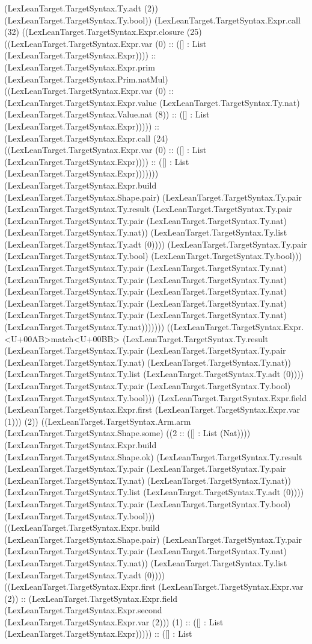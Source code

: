 \documentclass[11pt]{article}
\begin{document}
(LexLeanTarget.TargetSyntax.Ty.adt (2)) (LexLeanTarget.TargetSyntax.Ty.bool)) (LexLeanTarget.TargetSyntax.Expr.call (32) ((LexLeanTarget.TargetSyntax.Expr.closure (25) ((LexLeanTarget.TargetSyntax.Expr.var (0) :: ([] : List (LexLeanTarget.TargetSyntax.Expr)))) :: (LexLeanTarget.TargetSyntax.Expr.prim (LexLeanTarget.TargetSyntax.Prim.natMul) ((LexLeanTarget.TargetSyntax.Expr.var (0) :: (LexLeanTarget.TargetSyntax.Expr.value (LexLeanTarget.TargetSyntax.Ty.nat) (LexLeanTarget.TargetSyntax.Value.nat (8)) :: ([] : List (LexLeanTarget.TargetSyntax.Expr))))) :: (LexLeanTarget.TargetSyntax.Expr.call (24) ((LexLeanTarget.TargetSyntax.Expr.var (0) :: ([] : List (LexLeanTarget.TargetSyntax.Expr)))) :: ([] : List (LexLeanTarget.TargetSyntax.Expr))))))) (LexLeanTarget.TargetSyntax.Expr.build (LexLeanTarget.TargetSyntax.Shape.pair) (LexLeanTarget.TargetSyntax.Ty.pair (LexLeanTarget.TargetSyntax.Ty.result (LexLeanTarget.TargetSyntax.Ty.pair (LexLeanTarget.TargetSyntax.Ty.pair (LexLeanTarget.TargetSyntax.Ty.nat) (LexLeanTarget.TargetSyntax.Ty.nat)) (LexLeanTarget.TargetSyntax.Ty.list (LexLeanTarget.TargetSyntax.Ty.adt (0)))) (LexLeanTarget.TargetSyntax.Ty.pair (LexLeanTarget.TargetSyntax.Ty.bool) (LexLeanTarget.TargetSyntax.Ty.bool))) (LexLeanTarget.TargetSyntax.Ty.pair (LexLeanTarget.TargetSyntax.Ty.nat) (LexLeanTarget.TargetSyntax.Ty.pair (LexLeanTarget.TargetSyntax.Ty.nat) (LexLeanTarget.TargetSyntax.Ty.pair (LexLeanTarget.TargetSyntax.Ty.nat) (LexLeanTarget.TargetSyntax.Ty.pair (LexLeanTarget.TargetSyntax.Ty.nat) (LexLeanTarget.TargetSyntax.Ty.pair (LexLeanTarget.TargetSyntax.Ty.nat) (LexLeanTarget.TargetSyntax.Ty.nat))))))) ((LexLeanTarget.TargetSyntax.Expr.<U+00AB>match<U+00BB> (LexLeanTarget.TargetSyntax.Ty.result (LexLeanTarget.TargetSyntax.Ty.pair (LexLeanTarget.TargetSyntax.Ty.pair (LexLeanTarget.TargetSyntax.Ty.nat) (LexLeanTarget.TargetSyntax.Ty.nat)) (LexLeanTarget.TargetSyntax.Ty.list (LexLeanTarget.TargetSyntax.Ty.adt (0)))) (LexLeanTarget.TargetSyntax.Ty.pair (LexLeanTarget.TargetSyntax.Ty.bool) (LexLeanTarget.TargetSyntax.Ty.bool))) (LexLeanTarget.TargetSyntax.Expr.field (LexLeanTarget.TargetSyntax.Expr.first (LexLeanTarget.TargetSyntax.Expr.var (1))) (2)) ((LexLeanTarget.TargetSyntax.Arm.arm (LexLeanTarget.TargetSyntax.Shape.some) ((2 :: ([] : List (Nat)))) (LexLeanTarget.TargetSyntax.Expr.build (LexLeanTarget.TargetSyntax.Shape.ok) (LexLeanTarget.TargetSyntax.Ty.result (LexLeanTarget.TargetSyntax.Ty.pair (LexLeanTarget.TargetSyntax.Ty.pair (LexLeanTarget.TargetSyntax.Ty.nat) (LexLeanTarget.TargetSyntax.Ty.nat)) (LexLeanTarget.TargetSyntax.Ty.list (LexLeanTarget.TargetSyntax.Ty.adt (0)))) (LexLeanTarget.TargetSyntax.Ty.pair (LexLeanTarget.TargetSyntax.Ty.bool) (LexLeanTarget.TargetSyntax.Ty.bool))) ((LexLeanTarget.TargetSyntax.Expr.build (LexLeanTarget.TargetSyntax.Shape.pair) (LexLeanTarget.TargetSyntax.Ty.pair (LexLeanTarget.TargetSyntax.Ty.pair (LexLeanTarget.TargetSyntax.Ty.nat) (LexLeanTarget.TargetSyntax.Ty.nat)) (LexLeanTarget.TargetSyntax.Ty.list (LexLeanTarget.TargetSyntax.Ty.adt (0)))) ((LexLeanTarget.TargetSyntax.Expr.first (LexLeanTarget.TargetSyntax.Expr.var (2)) :: (LexLeanTarget.TargetSyntax.Expr.field (LexLeanTarget.TargetSyntax.Expr.second (LexLeanTarget.TargetSyntax.Expr.var (2))) (1) :: ([] : List (LexLeanTarget.TargetSyntax.Expr))))) :: ([] : List 
\end{document}
